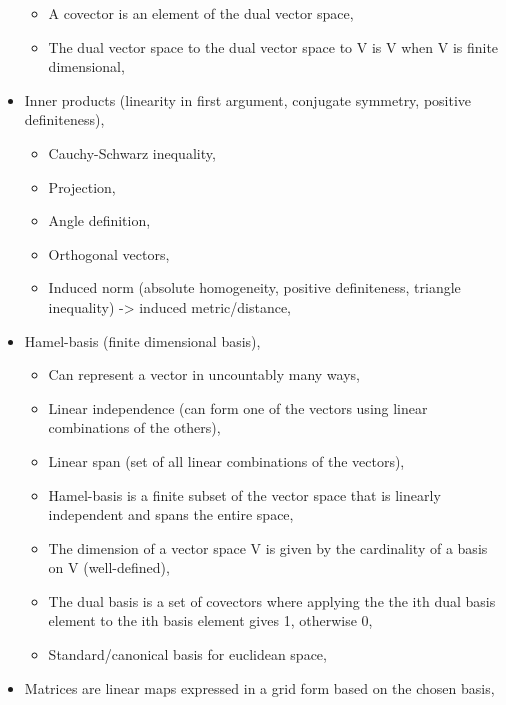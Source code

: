 \begin{itemize}
  \begin{itemize}
  \tightlist
  \item
    A covector is an element of the dual vector space,
  \item
    The dual vector space to the dual vector space to V is V when V is
    finite dimensional,
  \end{itemize}
\item
  Inner products (linearity in first argument, conjugate symmetry,
  positive definiteness),

  \begin{itemize}
  \tightlist
  \item
    Cauchy-Schwarz inequality,
  \item
    Projection,
  \item
    Angle definition,
  \item
    Orthogonal vectors,
  \item
    Induced norm (absolute homogeneity, positive definiteness, triangle
    inequality) -\textgreater{} induced metric/distance,
  \end{itemize}
\item
  Hamel-basis (finite dimensional basis),

  \begin{itemize}
  \tightlist
  \item
    Can represent a vector in uncountably many ways,
  \item
    Linear independence (can form one of the vectors using linear
    combinations of the others),
  \item
    Linear span (set of all linear combinations of the vectors),
  \item
    Hamel-basis is a finite subset of the vector space that is linearly
    independent and spans the entire space,
  \item
    The dimension of a vector space V is given by the cardinality of a
    basis on V (well-defined),
  \item
    The dual basis is a set of covectors where applying the the ith dual
    basis element to the ith basis element gives 1, otherwise 0,
  \item
    Standard/canonical basis for euclidean space,
  \end{itemize}
\item
  Matrices are linear maps expressed in a grid form based on the chosen
  basis,


\end{itemize}
